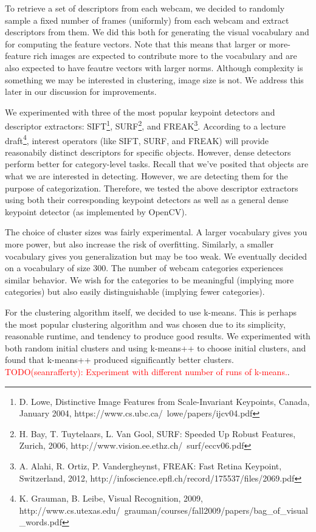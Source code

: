\documentclass{article}
\begin{document}
To retrieve a set of descriptors from each webcam, we decided to randomly
sample a fixed number of frames (uniformly) from each webcam and extract
descriptors from them. We did this both for generating the visual vocabulary
and for computing the feature vectors. Note that this means that larger or
more-feature rich images are expected to contribute more to the vocabulary and
are also expected to have feautre vectors with larger norms. Although
complexity is something we may be interested in clustering, image size is not.
We address this later in our discussion for improvements.

We experimented with three of the most popular keypoint detectors and
descriptor extractors: SIFT\footnote{D. Lowe, Distinctive Image Features from
  Scale-Invariant Keypoints, Canada, January 2004,
  https://www.cs.ubc.ca/~lowe/papers/ijcv04.pdf}, SURF\footnote{H. Bay, T.
  Tuytelaars, L. Van Gool, SURF: Speeded Up Robust Features,  Zurich, 2006,
  http://www.vision.ee.ethz.ch/~surf/eccv06.pdf}, and FREAK\footnote{A. Alahi,
  R. Ortiz, P. Vandergheynst, FREAK: Fast Retina Keypoint, Switzerland, 2012,
http://infoscience.epfl.ch/record/175537/files/2069.pdf}. According to a
lecture draft\footnote{K. Grauman, B. Leibe, Visual Recognition, 2009,
http://www.cs.utexas.edu/~grauman/courses/fall2009/papers/bag\_of\_visual\_words.pdf},
interest operators (like SIFT, SURF, and FREAK) will provide reasonabily
distinct descriptors for specific objects. However, dense detectors perform
better for category-level tasks. Recall that we've posited that objects are
what we are interested in detecting. However, we are detecting them for the
purpose of categorization. Therefore, we tested the above descriptor extractors
using both their corresponding keypoint detectors as well as a general dense
keypoint detector (as implemented by OpenCV).

The choice of cluster sizes was fairly experimental. A larger vocabulary gives
you more power, but also increase the risk of overfitting. Similarly, a smaller
vocabulary gives you generalization but may be too weak. We eventually decided
on a vocabulary of size $300$. The number of webcam categories experiences
similar behavior. We wish for the categories to be meaningful (implying more
categories) but also easily distinguishable (implying fewer categories).


For the clustering algorithm itself, we decided to use k-means. This is perhaps
the most popular clustering algorithm and was chosen due to its simplicity,
reasonable runtime, and tendency to produce good results. We experimented with
both random initial clusters and using k-means++ to choose initial clusters,
and found that k-means++ produced significantly better clusters.
\textcolor{red}{TODO(seanrafferty): Experiment with different number of runs of
k-means.}.
\end{document}
